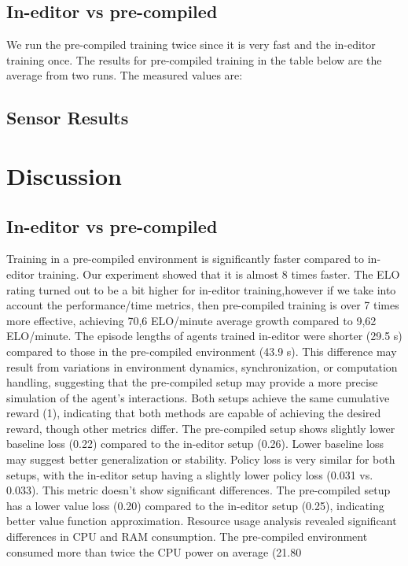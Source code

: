 \documentclass{LSkill}
\begin{document}
\subsection{In-editor vs pre-compiled}
We run the pre-compiled training twice since it is very fast and the in-editor training once.
The results for pre-compiled training in the table below are the average from two runs. The measured values are:


\subsection{Sensor Results}

\section{Discussion}


\subsection{In-editor vs pre-compiled}
Training in a pre-compiled environment is significantly faster compared to in-editor training. Our experiment showed that it is almost 8 times faster. The ELO rating turned out to be a bit higher for in-editor training,however if we take into account the  performance/time metrics, then pre-compiled training is over 7 times more effective, achieving 70,6 ELO/minute average growth compared to 9,62 ELO/minute. The episode lengths of agents trained in-editor were shorter (29.5 s) compared to those in the pre-compiled environment (43.9 s). This difference may result from variations in environment dynamics, synchronization, or computation handling, suggesting that the pre-compiled setup may provide a more precise simulation of the agent's interactions. Both setups achieve the same cumulative reward (1), indicating that both methods are capable of achieving the desired reward, though other metrics differ. The pre-compiled setup shows slightly lower baseline loss (0.22) compared to the in-editor setup (0.26). Lower baseline loss may suggest better generalization or stability. Policy loss is very similar for both setups, with the in-editor setup having a slightly lower policy loss (0.031 vs. 0.033). This metric doesn't show significant differences. The pre-compiled setup has a lower value loss (0.20) compared to the in-editor setup (0.25), indicating better value function approximation. Resource usage analysis revealed significant differences in CPU and RAM consumption. The pre-compiled environment consumed more than twice the CPU power on average (21.80%
\end{document}
